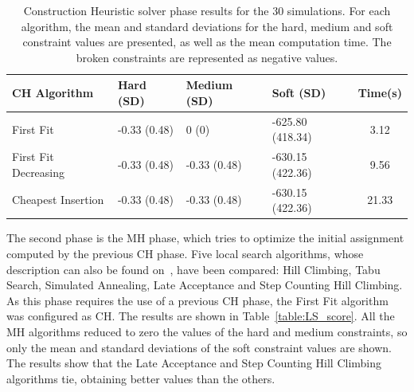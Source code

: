 \documentclass[letterpaper, 10 pt, conference]{ieeeconf}  %
\begin{document}
\begin{table}[htdp] 
		\caption{Construction Heuristic solver phase results for the 30 simulations. For each algorithm, the mean and standard deviations for the hard, medium and soft constraint values are presented, as well as the mean computation time. The broken constraints are represented as negative values. }
		\begin{tabular}{ | l | p{1cm} | p{1cm} | p{1cm} | c |}
	\hline
         CH Algorithm & Hard (SD) & Medium (SD) & Soft (SD) & Time(s)\\ \hline
         First Fit & -0.33 (0.48) & 0 (0) & -625.80 (418.34) & 3.12 \\ \hline
         First Fit Decreasing & -0.33 (0.48) & -0.33 (0.48) & -630.15 (422.36) & 9.56 \\ \hline
         Cheapest Insertion & -0.33 (0.48) & -0.33 (0.48) & -630.15 (422.36) & 21.33 \\ \hline
		\end{tabular}
	\label{table:CH_score}
\end{table}

The second phase is the MH phase, which tries to optimize the initial assignment computed by the previous CH phase. Five local search algorithms, whose description can also be found on~\cite{optaplanner_guide}, have been compared: Hill Climbing, Tabu Search, Simulated Annealing, Late Acceptance and Step Counting Hill Climbing. As this phase requires the use of a previous CH phase, the First Fit algorithm was configured as CH. The results are shown in Table~\ref{table:LS_score}. All the MH algorithms reduced to zero the values of the hard and medium constraints, so only the mean and standard deviations of the soft constraint values are shown. The results show that the Late Acceptance and Step Counting Hill Climbing algorithms tie, obtaining better values than the others.
\end{document}
